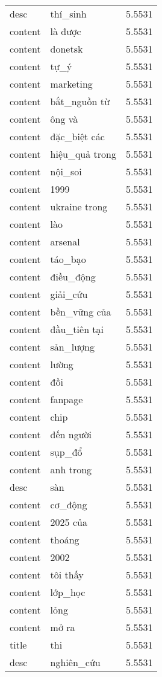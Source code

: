 \documentclass{article}
\begin{document}
\begin{tabular}{lll}
desc & thí\_sinh & 5.5531\\
content & là được & 5.5531\\
content & donetsk & 5.5531\\
content & tự\_ý & 5.5531\\
content & marketing & 5.5531\\
content & bắt\_nguồn từ & 5.5531\\
content & ông và & 5.5531\\
content & đặc\_biệt các & 5.5531\\
content & hiệu\_quả trong & 5.5531\\
content & nội\_soi & 5.5531\\
content & 1999 & 5.5531\\
content & ukraine trong & 5.5531\\
content & lào & 5.5531\\
content & arsenal & 5.5531\\
content & táo\_bạo & 5.5531\\
content & điều\_động & 5.5531\\
content & giải\_cứu & 5.5531\\
content & bền\_vững của & 5.5531\\
content & đầu\_tiên tại & 5.5531\\
content & sản\_lượng & 5.5531\\
content & lường & 5.5531\\
content & đồi & 5.5531\\
content & fanpage & 5.5531\\
content & chip & 5.5531\\
content & đến người & 5.5531\\
content & sụp\_đổ & 5.5531\\
content & anh trong & 5.5531\\
desc & sàn & 5.5531\\
content & cơ\_động & 5.5531\\
content & 2025 của & 5.5531\\
content & thoáng & 5.5531\\
content & 2002 & 5.5531\\
content & tôi thấy & 5.5531\\
content & lớp\_học & 5.5531\\
content & lỏng & 5.5531\\
content & mở ra & 5.5531\\
title & thi & 5.5531\\
desc & nghiên\_cứu & 5.5531\\

\end{tabular}
\end{document}
